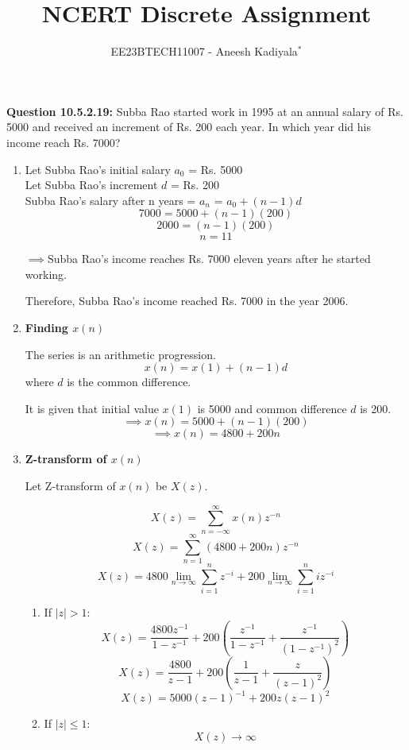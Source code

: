 \documentclass[journal,12pt,twocolumn]{IEEEtran}
\theoremstyle{remark}
\begin{document}

\vspace{3cm}

\title{NCERT Discrete Assignment}
\author{EE23BTECH11007 - Aneesh Kadiyala$^{*}$%
}
\maketitle
\newpage
\bigskip

\renewcommand{\thefigure}{\theenumi}
\renewcommand{\thetable}{\theenumi}

\vspace{3cm}
\textbf{Question 10.5.2.19:} Subba Rao started work in 1995 at an annual salary of Rs. 5000 and received an increment of Rs. 200 each year. In which year did his income reach Rs. 7000?
\\
\solution
\begin{enumerate}
\item
Let Subba Rao's initial salary $a_0$ = Rs. 5000
\\
Let Subba Rao's increment $d$ = Rs. 200
\\
Subba Rao's salary after n years = $a_n$ = $a_0 + (n - 1)d$
\\
\[7000 = 5000 + (n - 1)(200)\]
\[2000 = (n - 1)(200)\]
\[n = 11\]

$\implies$Subba Rao's income reaches Rs. 7000 eleven years after he started working.

Therefore, Subba Rao's income reached Rs. 7000 in the year 2006.

\item \textbf{Finding $x(n)$}

The series is an arithmetic progression.
\[x(n) = x(1) + (n - 1)d\]
where $d$ is the common difference.

It is given that initial value $x(1)$ is 5000 and common difference $d$ is 200.
\[\implies x(n) = 5000 + (n - 1)(200)\]
\[\implies x(n) = 4800 + 200n\]

\item \textbf{Z-transform of $x(n)$}

Let Z-transform of $x(n)$ be $X(z)$.

\[X(z) = \sum_{n = -\infty}^{\infty} x(n)z^{-n}\]
\[X(z) = \sum_{n = 1}^{\infty} (4800 + 200n)z^{-n}\]
\[X(z) = 4800\lim_{n\to\infty}\sum_{i = 1}^{n}z^{-i} + 200\lim_{n\to\infty}\sum_{i = 1}^{n}iz^{-i}\]

\begin{enumerate}
\item If $|z| > 1$:
\[X(z) = \frac{4800z^{-1}}{1 - z^{-1}} + 200(\frac{z^{-1}}{1 - z^{-1}} + \frac{z^{-1}}{(1-z^{-1})^2})\]
\[X(z) = \frac{4800}{z-1} + 200(\frac{1}{z-1} + \frac{z}{(z - 1)^2})\]
\[{X(z) = 5000(z - 1)^{-1} + 200z(z-1)^2}\]

\item If $|z| \le 1$:
\[X(z) \to \infty\]

\end{enumerate}

\end{enumerate}
\end{document}
